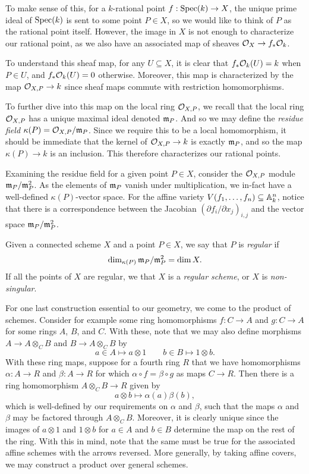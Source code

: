 To make sense of this,
for a $k$-rational point $f : {\rm Spec}(k) \to X$,
the unique prime ideal of ${\rm Spec}(k)$ is sent to some point $P \in X$,
so we would like to think of $P$ as the rational point itself.
However, the image in $X$ is not enough to characterize our rational point,
as we also have an associated map of sheaves $\mathcal{O}_X \to f_* \mathcal{O}_k$.

To understand this sheaf map, for any $U \subseteq X$,
it is clear that $f_*\mathcal{O}_k(U) = k$ when $P \in U$,
and $f_*\mathcal{O}_k(U) = 0$ otherwise.
Moreover, this map is characterized by the map $\mathcal{O}_{X,P} \to k$ since sheaf maps commute with restriction homomorphisms.

To further dive into this map on the local ring $\mathcal{O}_{X, P}$,
we recall that the local ring $\mathcal{O}_{X, P}$ has a unique maximal ideal denoted $\mathfrak{m}_P$.
And so we may define the \textit{residue field} $\kappa(P) = \mathcal{O}_{X,P} / \mathfrak{m}_P$.
Since we require this to be a local homomorphism,
it should be immediate that the kernel of $\mathcal{O}_{X, P} \to k$ is exactly $\mathfrak{m}_P$,
and so the map $\kappa(P) \to k$ is an inclusion.
This therefore characterizes our rational points.

Examining the residue field for a given point $P \in X$,
consider the $\mathcal{O}_{X,P}$ module $\mathfrak{m}_P / \mathfrak{m}_P^2$.
As the elements of $\mathfrak{m}_P$ vanish under multiplication,
we in-fact have a well-defined $\kappa(P)$-vector space.
For the affine variety $V(f_1, \ldots, f_n) \subseteq \mathbb{A}_k^n$,
notice that there is a correspondence between the Jacobian $(\partial f_i / \partial x_j)_{i,j}$
and the vector space $\mathfrak{m}_P / \mathfrak{m}_P^2$.


\begin{definition}
    Given a connected scheme $X$ and a point $P \in X$,
    we say that $P$ is \textit{regular} if
    \[
        \dim_{\kappa(P)} \mathfrak{m}_P / \mathfrak{m}_P^2 = \dim X.
    \]
    If all the points of $X$ are regular, 
    we that $X$ is a \textit{regular scheme}, or $X$ is \textit{non-singular}.
\end{definition}

For one last construction essential to our geometry, we come to the product of schemes.
Consider for example some ring homomorphisms $f : C \to A$ and $g : C \to A$ for some rings $A$, $B$, and $C$.
With these, note that we may also define morphisms $A \to A \otimes_C B$ and $B \to A \otimes_C B$ by
\[
    a \in A \mapsto a \otimes 1 \qquad 
    b \in B \mapsto 1 \otimes b.
\]
With these ring maps, 
suppose for a fourth ring $R$ that we have homomorphisms $\alpha : A \to R$ and $\beta : A \to R$ for which $\alpha \circ f = \beta \circ g$ as maps $C \to R$.
Then there is a ring homomorphism $A \otimes_C B \to R$ given by
\[
    a \otimes b \mapsto \alpha(a)\beta(b),
\]
which is well-defined by our requirements on $\alpha$ and $\beta$,
such that the maps $\alpha$ and $\beta$ may be factored through $A \otimes_C B$.
Moreover, it is clearly unique since the images of $a \otimes 1$ and $1 \otimes b$ for $a \in A$ and $b \in B$ determine the map on the rest of the ring.
With this in mind,
note that the same must be true for the associated affine schemes with the arrows reversed.
More generally, by taking affine covers,
we may construct a product over general schemes.

